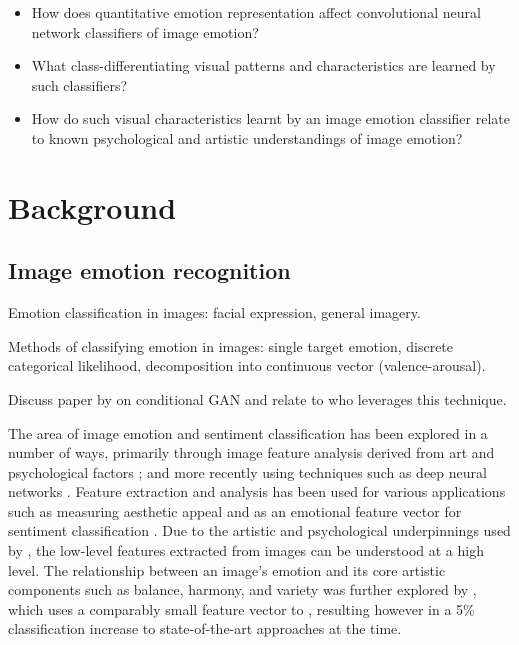 \documentclass{article}
\begin{document}
\begin{itemize}
	\item How does quantitative emotion representation affect convolutional neural network classifiers of image emotion?
	\item What class-differentiating visual patterns and characteristics are learned by such classifiers?
	\item How do such visual characteristics learnt by an image emotion classifier relate to known psychological and artistic understandings of image emotion?
\end{itemize}


\section{Background}

\subsection{Image emotion recognition}
\begin{todolist}
	\item Emotion classification in images: facial expression, general imagery.
	\item Methods of classifying emotion in images: single target emotion, discrete categorical likelihood, decomposition into continuous vector (valence-arousal).
	\item Discuss paper by \citet{gauthier2014conditional} on conditional GAN and relate to \citet{tan2017artgan} who leverages this technique.
\end{todolist}

The area of image emotion and sentiment classification has been explored in a number of ways, primarily through image feature analysis derived from art and psychological factors \citep{machajdik2010affective}; and more recently using techniques such as deep neural networks \citep{chen2015learning, kim2018building}.
Feature extraction and analysis has been used for various applications such as measuring aesthetic appeal \citep{den2010using,den2010comparing,den2011evolving} and as an emotional feature vector for sentiment classification \citep{machajdik2010affective}.
Due to the artistic and psychological underpinnings used by \citet{machajdik2010affective}, the low-level features extracted from images can be understood at a high level.
The relationship between an image's emotion and its core artistic components such as balance, harmony, and variety was further explored by \citet{zhao2014exploring}, which uses a comparably small feature vector to \citet{machajdik2010affective}, resulting however in a 5\% classification increase to state-of-the-art approaches at the time.
\end{document}
